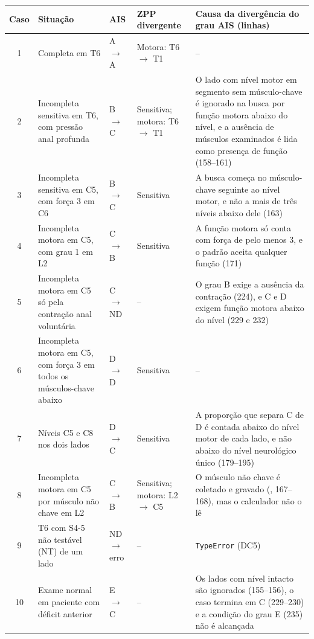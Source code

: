 \begin{quadro}[htb]
	\centering
	\caption{Casos fictícios da ASIA: grau AIS e ZPP esperados e obtidos pelo servidor}
	\label{qua:aut-asia}
	\footnotesize
	\begin{tabularx}{\textwidth}{|c|>{\raggedright\arraybackslash}p{}|>{\raggedright\arraybackslash}p{}|>{\raggedright\arraybackslash}p{}|>{\raggedright\arraybackslash}X|}
		\hline
		Caso & Situação & AIS & ZPP divergente & Causa da divergência do grau AIS (linhas) \\ \hline
		1 & Completa em T6 & A $\to$ A & Motora: T6 $\to$ T1 & -- \\ \hline
		2 & Incompleta sensitiva em T6, com pressão anal profunda & B $\to$ C & Sensitiva; motora: T6 $\to$ T1 &
			O lado com nível motor em segmento sem músculo-chave é ignorado na busca por função motora abaixo do
			nível, e a ausência de músculos examinados é lida como presença de função (158--161) \\ \hline
		3 & Incompleta sensitiva em C5, com força 3 em C6 & B $\to$ C & Sensitiva & A busca começa no
			músculo-chave seguinte ao nível motor, e não a mais de três níveis abaixo dele (163) \\ \hline
		4 & Incompleta motora em C5, com grau 1 em L2 & C $\to$ B & Sensitiva & A função motora só conta com força
			de pelo menos 3, e o padrão aceita qualquer função (171) \\ \hline
		5 & Incompleta motora em C5 só pela contração anal voluntária & C $\to$ ND & -- & O grau B exige a ausência
			da contração (224), e C e D exigem função motora abaixo do nível (229 e 232) \\ \hline
		6 & Incompleta motora em C5, com força 3 em todos os músculos-chave abaixo & D $\to$ D & Sensitiva & -- \\ \hline
		7 & Níveis C5 e C8 nos dois lados & D $\to$ C & Sensitiva & A proporção que separa C de D é contada abaixo
			do nível motor de cada lado, e não abaixo do nível neurológico único (179--195) \\ \hline
		8 & Incompleta motora em C5 por músculo não chave em L2 & C $\to$ B & Sensitiva; motora: L2 $\to$ C5 & O
			músculo não chave é coletado e gravado (\arq{main.py}, 167--168), mas o calculador não o lê \\ \hline
		9 & T6 com S4-5 não testável (NT) de um lado & ND $\to$ erro & -- & \texttt{TypeError} (DC5) \\ \hline
		10 & Exame normal em paciente com déficit anterior & E $\to$ C & -- & Os lados com nível intacto são
			ignorados (155--156), o caso termina em C (229--230) e a condição do grau E (235) não é alcançada \\ \hline
	\end{tabularx}
\end{quadro}
